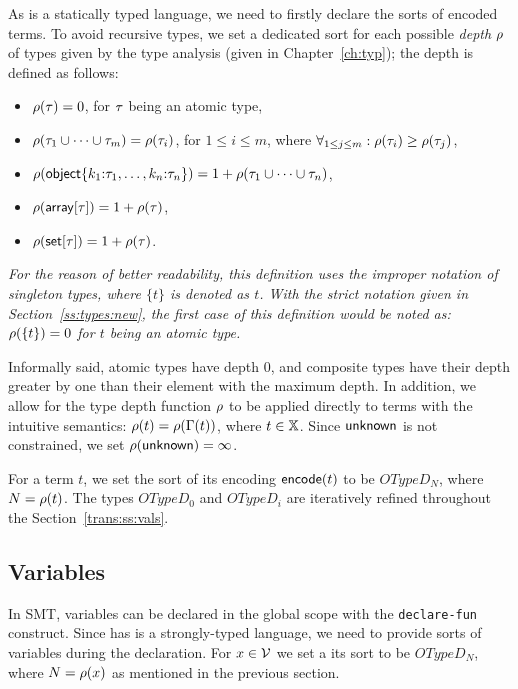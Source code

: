As \smtlib is a statically typed language, we need to firstly declare the sorts of encoded terms.
To avoid recursive types, we set a dedicated sort for each possible \emph{depth} $\rho$ of types given by the type analysis (given in Chapter~\ref{ch:typ}); the depth is defined as follows:
\begin{itemize}
  \item $\rho(\tau) = 0$, for $\tau$ being an atomic type,
  \item $\rho(\tau_1 \cup \cdots \cup \tau_m) = \rho(\tau_i)$, for $1 \leq i \leq m$, where $\forall_{1 \leq j \leq m}:\rho(\tau_i) \geq \rho(\tau_j)$,
  \item $\rho(\mathsf{object}\{k_1{:}\tau_1,\ldots,k_n{:}\tau_n\}) = 1+\rho(\tau_1 \cup \cdots \cup \tau_n)$,
  \item $\rho(\mathsf{array}[{\tau}]) = 1+\rho(\tau)$,
  \item $\rho(\mathsf{set}[{\tau}]) = 1+\rho(\tau)$.
\end{itemize}
\textit{For the reason of better readability, this definition uses the improper notation of singleton types, where $\{t\}$ is denoted as $t$.
With the strict notation given in Section~\ref{ss:types:new}, the first case of this definition would be noted as: $\rho(\{t\}) = 0$ for $t$ being an atomic type.}

Informally said, atomic types have depth $0$, and composite types have their depth greater by one than their element with the maximum depth.
In addition, we allow for the type depth function $\rho$ to be applied directly to terms with the intuitive semantics: $\rho(t) = \rho(\Gamma(t))$, where $t \in \mathbb{X}$.
Since $\mathsf{unknown}$ is not constrained, we set $\rho(\mathsf{unknown}) = \infty$.

For a term $t$, we set the sort of its encoding $\mathsf{encode}(t)$ to be \texttt{$OTypeD_N$}, where $N = \rho(t)$.
The types $OTypeD_0$ and $OTypeD_i$ are iteratively refined throughout the Section~\ref{trans:ss:vals}.

\subsection{Variables}
\label{ss:vars:t}

In SMT, variables can be declared in the global scope with the \texttt{declare-fun} construct.
Since \smtlib has is a strongly-typed language, we need to provide sorts of variables during the declaration.
For $x \in \mathcal{V}$ we set a its sort to be \texttt{$OTypeD_N$}, where $N = \rho(x)$ as mentioned in the previous section.

